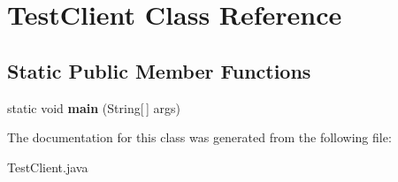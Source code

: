 \hypertarget{class_test_client}{}\section{Test\+Client Class Reference}
\label{class_test_client}
\subsection*{Static Public Member Functions}
\begin{DoxyCompactItemize}
\item 
static void {\bfseries main} (String\mbox{[}$\,$\mbox{]} args)\hypertarget{class_test_client_a23b2b902887947b9e3f3b24b29078d72}{}\label{class_test_client_a23b2b902887947b9e3f3b24b29078d72}

\end{DoxyCompactItemize}


The documentation for this class was generated from the following file\+:\begin{DoxyCompactItemize}
\item 
Test\+Client.\+java\end{DoxyCompactItemize}
